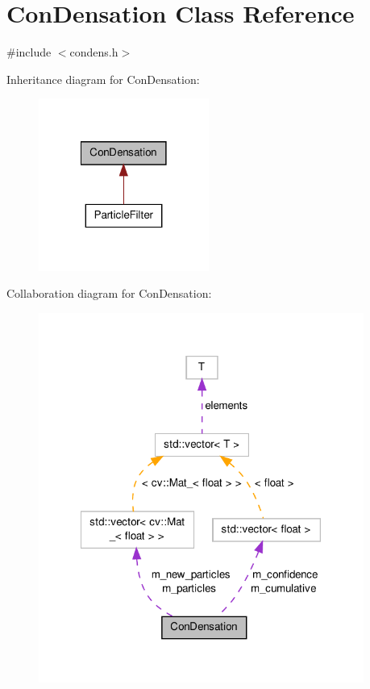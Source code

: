 \hypertarget{classConDensation}{\section{Con\-Densation Class Reference}
\label{classConDensation}
}


{\ttfamily \#include $<$condens.\-h$>$}



Inheritance diagram for Con\-Densation\-:\nopagebreak
\begin{figure}[H]
\begin{center}
\leavevmode
\includegraphics[width=158pt]{classConDensation__inherit__graph}
\end{center}
\end{figure}


Collaboration diagram for Con\-Densation\-:\nopagebreak
\begin{figure}[H]
\begin{center}
\leavevmode
\includegraphics[width=302pt]{classConDensation__coll__graph}
\end{center}
\end{figure}
